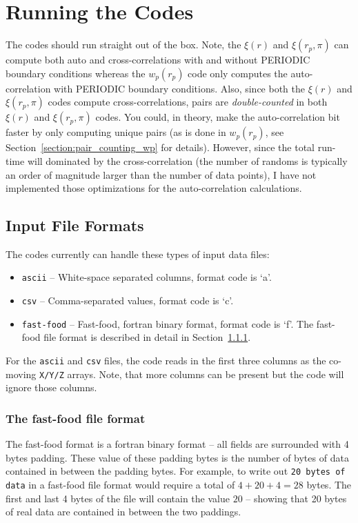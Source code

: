 \documentclass[12pt,titlepage]{article}
\let\stdsection\section
\newcommand{\xir}{\ensuremath{{\xi(r)}}\xspace}
\newcommand{\wprp}{\ensuremath{{w_p(r_p)}}\xspace}
\newcommand{\xirppi}{\ensuremath{{\xi(r_p,\pi)}}\xspace}
\begin{document}
\stdsection{Running the Codes}
The codes should run straight out of the box. Note, the \xir and \xirppi can compute both auto and cross-correlations with and without PERIODIC boundary conditions whereas the \wprp code 
only computes the auto-correlation with PERIODIC boundary conditions. Also, since both the \xir and \xirppi codes compute cross-correlations, pairs are {\em double-counted} in both 
\xir and \xirppi codes. You could, in theory, make the auto-correlation bit faster by only computing unique pairs (as is done in \wprp, see Section~\ref{section:pair_counting_wp} 
for details). However, since the total run-time will dominated by the cross-correlation (the number of randoms is typically an order of magnitude larger than the number 
of data points), I have not implemented those optimizations for the auto-correlation calculations. 
\subsection{Input File Formats}\label{section:formats}
The codes currently can handle these types of input data files:
\begin{itemize}
\item \texttt{ascii} -- White-space separated columns, format code is `a'.
\item \texttt{csv}   -- Comma-separated values, format code is `c'.
\item \texttt{fast-food} -- Fast-food, fortran binary format, format code is `f'.
The fast-food file format is described in detail in Section~\ref{section:fastfood}.
\end{itemize}
For the \texttt{ascii} and \texttt{csv} files, the code reads in the first three columns as the co-moving \texttt{X/Y/Z} arrays. Note, that more columns 
can be present but the code will ignore those columns. 

\subsubsection{The fast-food file format}\label{section:fastfood}
The fast-food format is a fortran binary format -- all fields are surrounded with 4 bytes padding. These value of these padding bytes 
is the number of bytes of data contained in between the padding bytes. For example, to write out \texttt{20 bytes of data} in 
a fast-food file format would require a total of $4+20+4=28$ bytes. The first and last 4 bytes of the file will contain the value $20$ -- 
showing that 20 bytes of real data are contained in between the two paddings. 
\end{document}
